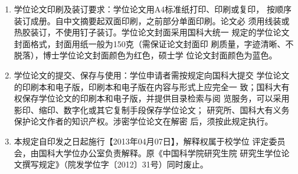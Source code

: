 \begin{enumerate}
  \item 学位论文印刷及装订要求：学位论文用A4标准纸打印、印刷或复印，
    按顺序装订成册。自中文摘要起双面印刷，之前部分单面印刷。论文必
    须用线装或热胶装订，不使用钉子装订。学位论文封面采用国科大统一
    规定的学位论文封面格式，封面用纸一般为150克（需保证论文封面印
    刷质量，字迹清晰、不脱落），博士学位论文封面颜色为红色，硕士学
    位论文封面颜色为蓝色。

  \item 学位论文的提交、保存与使用：学位申请者需按规定向国科大提交
    学位论文的印刷本和电子版，印刷本和电子版在内容与形式上应完全一
    致；国科大有权保存学位论文的印刷本和电子版，并提供目录检索与阅
    览服务，可以采用影印、缩印、数字化或其它复制手段保存学位论文；
    研究所、国科大有义务保护论文作者的知识产权。涉密学位论文在解密
    后，须按此规定执行。

  \item 本规定自印发之日起施行【2013年04月07日】，解释权属于校学位
    评定委员会，由国科大学位办公室负责解释。原《中国科学院研究生院
    研究生学位论文撰写规定》（院发学位字〔2012〕31号）同时废止。
\end{enumerate}

